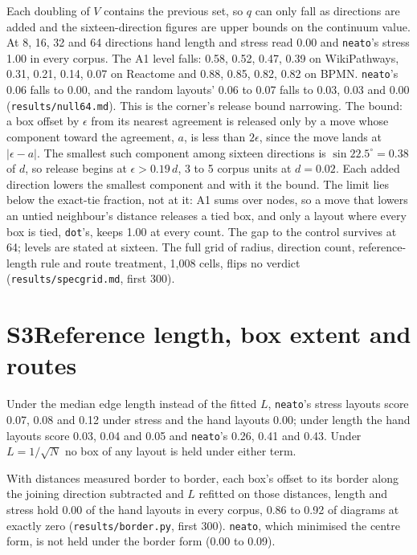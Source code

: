 \documentclass[11pt]{article}
\begin{document}
Each doubling of $V$ contains the previous set, so $q$ can only fall as directions are
added and the sixteen-direction figures are upper bounds on the continuum value. At 8, 16,
32 and 64 directions hand length and stress read 0.00 and \texttt{neato}'s stress 1.00 in
every corpus. The A1 level falls: 0.58, 0.52, 0.47, 0.39 on WikiPathways, 0.31, 0.21,
0.14, 0.07 on Reactome and 0.88, 0.85, 0.82, 0.82 on BPMN. \texttt{neato}'s 0.06 falls to
0.00, and the random layouts' 0.06 to 0.07 falls to 0.03, 0.03 and 0.00
(\texttt{results/null64.md}). This is the corner's release bound narrowing. The bound: a
box offset by $\epsilon$ from its nearest agreement is released only by a move whose
component toward the agreement, $a$, is less than $2\epsilon$, since the move lands at
$|\epsilon - a|$. The smallest such component among sixteen directions is $\sin 22.5^\circ
= 0.38$ of $d$, so release begins at $\epsilon > 0.19\,d$, 3 to 5 corpus units at $d =
0.02$. Each added direction lowers the smallest component and with it the bound. The limit
lies below the exact-tie fraction, not at it: A1 sums over
nodes, so a move that lowers an untied neighbour's distance releases a tied box, and only
a layout where every box is tied, \texttt{dot}'s, keeps 1.00 at every count. The gap to
the control survives at 64; levels are stated at sixteen. The full grid of radius,
direction count, reference-length rule and route treatment, 1,008 cells, flips no verdict
(\texttt{results/specgrid.md}, first 300).

\section*{S3\quad Reference length, box extent and routes}

Under the median edge length instead of the fitted $L$, \texttt{neato}'s stress layouts
score 0.07, 0.08 and 0.12 under stress and the hand layouts 0.00; under length the hand
layouts score 0.03, 0.04 and 0.05 and \texttt{neato}'s 0.26, 0.41 and 0.43. Under
$L = 1/\sqrt{N}$ no box of any layout is held under either term.

With distances measured border to border, each box's offset to its border along the
joining direction subtracted and $L$ refitted on those distances, length and stress hold
0.00 of the hand layouts in every corpus, 0.86 to 0.92 of diagrams at exactly zero
(\texttt{results/border.py}, first 300). \texttt{neato}, which minimised the centre form,
is not held under the border form (0.00 to 0.09).
\end{document}
